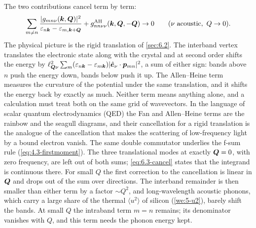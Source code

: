 The two contributions cancel term by term:
\begin{equation}
  \sum_{m\ne n}\frac{|g_{mn\nu}(\bm{k},\bm{Q})|^2}{\varepsilon_{n\bm{k}} - \varepsilon_{m,\bm{k}+\bm{Q}}} + g^{\mathrm{AH}}_{nn\nu\nu}(\bm{k},\bm{Q},-\bm{Q}) \to 0 \qquad (\nu \text{ acoustic},\ Q \to 0) .
  \label{eq:6.3-cancel}
\end{equation}
The physical picture is the rigid translation of \cref{sec:6.2}. The interband vertex translates the electronic state along with the crystal and at second order shifts the energy by $\ell_{\bm{Q}\nu}^2\sum_m(\varepsilon_{n\bm{k}} - \varepsilon_{m\bm{k}})|\hat{\bm{e}}_\nu\cdot\bm{p}_{mn}|^2$, a sum of either sign: bands above $n$ push the energy down, bands below push it up. The Allen--Heine term measures the curvature of the potential under the same translation, and it shifts the energy back by exactly as much. Neither term means anything alone, and a calculation must treat both on the same grid of wavevectors. In the language of scalar quantum electrodynamics (QED) the Fan and Allen--Heine terms are the rainbow and the seagull diagrams, and their cancellation for a rigid translation is the analogue of the cancellation that makes the scattering of low-frequency light by a bound electron vanish. The same double commutator underlies the f-sum rule (\cref{eq:4.3-firstmoment}). The three translational modes at exactly $\bm{Q} = 0$, with zero frequency, are left out of both sums; \cref{eq:6.3-cancel} states that the integrand is continuous there. For small $Q$ the first correction to the cancellation is linear in $\bm{Q}$ and drops out of the sum over directions. The interband remainder is then smaller than either term by a factor $\sim Q^2$, and long-wavelength acoustic phonons, which carry a large share of the thermal $\langle u^2\rangle$ of silicon (\cref{we:5-u2}), barely shift the bands. At small $Q$ the intraband term $m = n$ remains; its denominator vanishes with $Q$, and this term needs the phonon energy kept.


